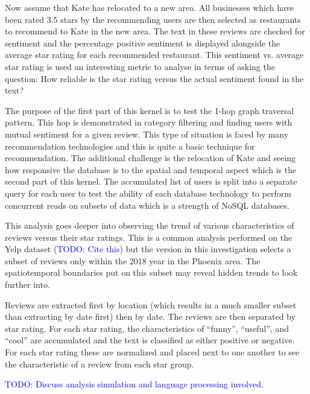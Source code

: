 Now assume that Kate has relocated to a new area. All businesses which have been rated 3.5 stars by the recommending users are then selected as restaurants to recommend to Kate in the new area. The text in these reviews are checked for sentiment and the percentage positive sentiment is displayed alongside the average star rating for each recommended restaurant. This sentiment vs. average star rating is used an interesting metric to analyse in terms of asking the question: How reliable is the star rating versus the actual sentiment found in the text?

The purpose of the first part of this kernel is to test the 1-hop graph traversal pattern. This hop is demonstrated in category filtering and finding users with mutual sentiment for a given review. This type of situation is faced by many recommendation technologies and this is quite a basic technique for recommendation. The additional challenge is the relocation of Kate and seeing how responsive the database is to the spatial and temporal aspect which is the second part of this kernel. The accumulated list of users is split into a separate query for each user to test the ability of each database technology to perform concurrent reads on subsets of data which is a strength of NoSQL databases.

This analysis goes deeper into observing the trend of various characteristics of reviews versus their star ratings. This is a common analysis performed on the Yelp dataset (\textcolor{blue}{TODO: Cite this}) but the version in this investigation selects a subset of reviews only within the 2018 year in the Phoenix area. The spatiotemporal boundaries put on this subset may reveal hidden trends to look further into.

Reviews are extracted first by location (which results in a much smaller subset than extracting by date first) then by date. The reviews are then separated by star rating. For each star rating, the characteristics of ``funny'', ``useful'', and ``cool'' are accumulated and the text is classified as either positive or negative. For each star rating these are normalized and placed next to one another to see the characteristic of a review from each star group.

\subsubsubsection{\textcolor{blue}{ TODO: Come up with a third kernel.}}
\textcolor{blue}{ TODO: Discuss analysis simulation and language processing involved.}
